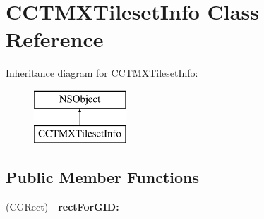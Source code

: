 \hypertarget{interface_c_c_t_m_x_tileset_info}{\section{C\-C\-T\-M\-X\-Tileset\-Info Class Reference}
\label{interface_c_c_t_m_x_tileset_info}
}
Inheritance diagram for C\-C\-T\-M\-X\-Tileset\-Info\-:\begin{figure}[H]
\begin{center}
\leavevmode
\includegraphics[height=2.000000cm]{interface_c_c_t_m_x_tileset_info}
\end{center}
\end{figure}
\subsection*{Public Member Functions}
\begin{DoxyCompactItemize}
\item 
\hypertarget{interface_c_c_t_m_x_tileset_info_a1a2de4165fcbbfb87a8f32e546168f44}{(C\-G\-Rect) -\/ {\bfseries rect\-For\-G\-I\-D\-:}}\label{interface_c_c_t_m_x_tileset_info_a1a2de4165fcbbfb87a8f32e546168f44}

\end{DoxyCompactItemize}
